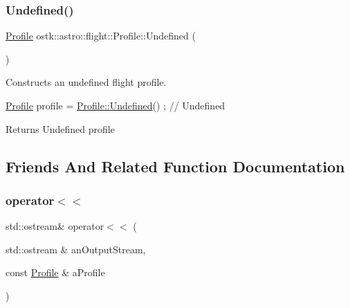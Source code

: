 \subsubsection{\texorpdfstring{Undefined()}{Undefined()}}
{\footnotesize\ttfamily \hyperlink{classostk_1_1astro_1_1flight_1_1_profile}{Profile} ostk\+::astro\+::flight\+::\+Profile\+::\+Undefined (\begin{DoxyParamCaption}{ }\end{DoxyParamCaption})\hspace{0.3cm}{\ttfamily [static]}}



Constructs an undefined flight profile. 


\begin{DoxyCode}
\hyperlink{classostk_1_1astro_1_1flight_1_1_profile_a09d523b4a58db0d8cc082b4a4d1418a7}{Profile} profile = \hyperlink{classostk_1_1astro_1_1flight_1_1_profile_aa966c10872c2d193d43c358b25f64289}{Profile::Undefined}() ; \textcolor{comment}{// Undefined}
\end{DoxyCode}


\begin{DoxyReturn}{Returns}
Undefined profile 
\end{DoxyReturn}


\subsection{Friends And Related Function Documentation}
\mbox{\label{classostk_1_1astro_1_1flight_1_1_profile_a8747e69fc10f1b068a0dd02d79da3b95}} 
\subsubsection{\texorpdfstring{operator$<$$<$}{operator<<}}
{\footnotesize\ttfamily std\+::ostream\& operator$<$$<$ (\begin{DoxyParamCaption}\item[{std\+::ostream \&}]{an\+Output\+Stream,  }\item[{const \hyperlink{classostk_1_1astro_1_1flight_1_1_profile}{Profile} \&}]{a\+Profile }\end{DoxyParamCaption})\hspace{0.3cm}{\ttfamily [friend]}}



